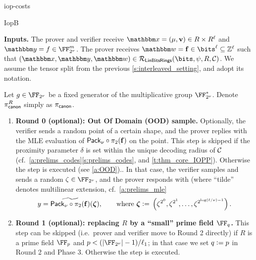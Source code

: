 \begin{lncsappendix}{iop-costs}
\begin{lncsmove}{IopB}
\begin{construction}
\noindent \textbf{Inputs.} The prover and verifier receive $\inp=(\mu, \vv)\in \evalfield \times \evalfield^{\codedim}$ and  $\oracle= f \in \comfield^\codelength$. The prover receives $\wit= \bff\in \bits^\codedim \subseteq \ZZ^\codedim$ such that $(\inp,\oracle, \wit) \in \LinBitsDual(\bits,\lncsbreak\ringmorphism,\lncsbreak \evalfield,\lncsbreak\cC)$.  We assume the tensor split from the previous \cref{s:interleaved_setting}, and adopt its notation. 


Let $\basegenerator\in \comfield$ be a fixed generator of the multiplicative group $\comfield^*$. Denote $\pi_{\mathsf{canon}}^R$ simply as $\pi_{\mathsf{canon}}$.  %


\begin{enumerate}[leftmargin=*] 


\item \textbf{Round 0 (optional): Out Of Domain (OOD) sample.} Optionally, the verifier sends a random point of a certain shape, and the prover replies with the MLE evaluation of $\mathsf{Pack}_\nu\circ\pi_2(\mathbf{f})$ on the point.  This step is skipped if the proximity parameter $\delta$ is  set within the unique decoding radius of $\mathcal{C}$ (cf.\ \iflncs\cref{a:prelims_codes}\else\cref{s:prelims_codes}\fi, and \cref{t:thm_core_IOPP}). Otherwise the step is executed (see \cref{a:OOD})\iflncs.\else. In that case, the verifier samples and sends a random $\zeta\in \comfield$, and the prover responds with \iflncs(where ``tilde'' denotes multilinear extension, cf.\ \cref{a:prelims_mle}\fi$$y={\widetilde{\mathsf{Pack}_\nu\circ\pi_2(\mathbf{f})}}(\bm{\zeta}), \qquad \text{where } \bm{\zeta}{\;\vcentcolon=\;} \left(\zeta^{2^0}, \zeta^{2^1}, \ldots, \zeta^{2^{\log (\ell/\nu) -1}}\right).$$\fi
\item \textbf{Round 1 (optional): replacing $R$ by a ``small'' prime field $\FF_q$.}
This step can be skipped (i.e.\ prover and verifier move to Round 2 directly) if $R$ is a prime field $\FF_p$ and $p < \fieldboundsizeexponent$; in that case we set $q{\;\vcentcolon=\;} p$ in Round 2 and Phase 3. Otherwise the step is executed. %


\end{enumerate}
\end{construction}
\end{lncsmove}
\end{lncsappendix}
